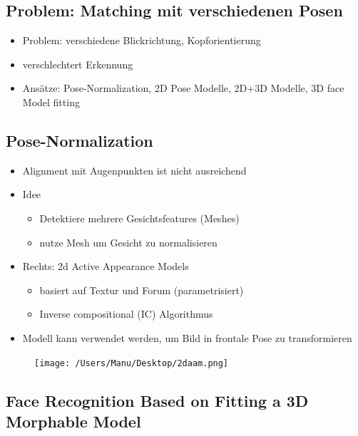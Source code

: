 \documentclass[paper=a4, fontsize=11pt]{scrartcl} %
\numberwithin{equation}{section} %
\numberwithin{figure}{section} %
\numberwithin{table}{section} %
\begin{document}
\subsection{Problem: Matching mit verschiedenen Posen}

\begin{itemize}
\item Problem: verschiedene Blickrichtung, Kopforientierung
\item verschlechtert Erkennung
\item Ansätze: Pose-Normalization, 2D Pose Modelle, 2D+3D Modelle, 3D face Model fitting
\end{itemize}

\subsection{Pose-Normalization}

\begin{minipage}{0.65\textwidth}
\begin{itemize}
\item Alignment mit Augenpunkten ist nicht ausreichend
\item Idee
\begin{itemize}
\item Detektiere mehrere Gesichtsfeatures (Meshes)
\item nutze Mesh um Gesicht zu normalisieren
\end{itemize}
\item Rechts: 2d Active Appearance Models
\begin{itemize}
\item basiert auf Textur und Forum (parametrisiert)
\item Inverse compositional (IC) Algorithmus
\end{itemize}
\item Modell kann verwendet werden, um Bild in frontale Pose zu transformieren
\end{itemize}
\end{minipage} \hfill
\begin{minipage}{0.2\textwidth}
\begin{figure}[H]
\texttt{[image: /Users/Manu/Desktop/2daam.png]}
\end{figure}
\end{minipage}

\subsection{Face Recognition Based on Fitting a 3D Morphable Model}
\end{document}
